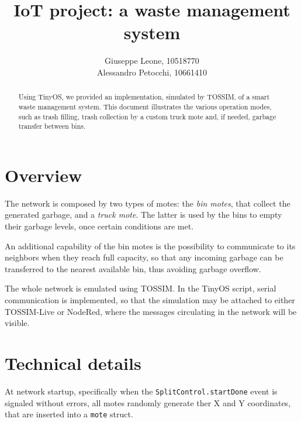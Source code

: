 \documentclass[]{article}
\title{IoT project: a waste management system}
\author{Giuseppe Leone, 10518770 \\ Alessandro Petocchi, 10661410}
\date{}
\begin{document}
\maketitle
\begin{abstract}
	\noindent Using TinyOS, we provided an implementation, simulated by TOSSIM, of a smart waste management system. This document illustrates the various operation modes, such as trash filling, trash collection by a custom truck mote and, if needed, garbage transfer between bins. 
\end{abstract}

\section{Overview}
The network is composed by two types of motes: the \textit{bin motes}, that collect the generated garbage, and a \textit{truck mote}. The latter is used by the bins to empty their garbage levels, once certain conditions are met.

\noindent An additional capability of the bin motes is the possibility to communicate to its neighbors when they reach full capacity, so that any incoming garbage can be transferred to the nearest available bin, thus avoiding garbage overflow.

\noindent The whole network is emulated using TOSSIM. In the TinyOS script, serial communication is implemented, so that the simulation may be attached to either TOSSIM-Live or NodeRed, where the messages circulating in the network will be visible.
\section{Technical details}
At network startup, specifically when the \texttt{SplitControl.startDone} event is signaled without errors, all motes randomly generate ther X and Y coordinates, that are inserted into a \texttt{mote} struct. 
\end{document}
